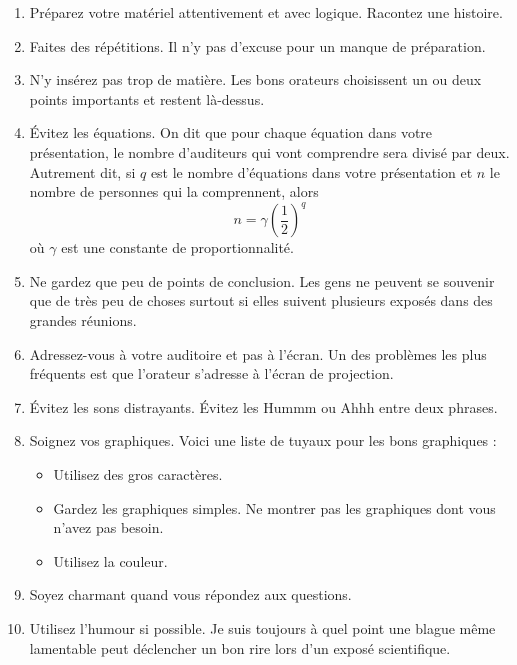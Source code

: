 \documentclass[12pt]{article}
\begin{document}
\begin{enumerate}

\item Préparez votre matériel attentivement et avec logique. Racontez une histoire.

\item Faites des répétitions. Il n'y pas d'excuse pour un manque de préparation.

\item N'y insérez pas trop de matière. Les bons orateurs choisissent un ou deux points importants et restent là-dessus.

\item Évitez les équations. On dit que pour chaque équation dans votre présentation, le nombre d'auditeurs qui vont comprendre sera divisé par deux. Autrement dit, si $q$ est le nombre d'équations dans votre présentation et $n$ le nombre de personnes qui la comprennent, alors 
\begin{equation}
n = \gamma \left( \frac{1}{2} \right)^q
\end{equation}
où $\gamma$ est une constante de proportionnalité.

\item Ne gardez que peu de points de conclusion. Les gens ne peuvent se souvenir que de très peu de choses surtout si elles suivent plusieurs exposés dans des grandes réunions.

\item Adressez-vous à votre auditoire et pas à l'écran. Un des problèmes les plus fréquents est que l'orateur s'adresse à l'écran de projection.

\item Évitez les sons distrayants. Évitez les \og Hummm\fg{} ou \og Ahhh\fg{} entre deux phrases.

\item Soignez vos graphiques. Voici une liste de tuyaux pour les bons graphiques :

\begin{itemize}
\item Utilisez des gros caractères.

\item Gardez les graphiques simples. Ne montrer pas les graphiques dont vous n'avez pas besoin.

\item Utilisez la couleur.

\end{itemize}

\item Soyez charmant quand vous répondez aux questions.

\item Utilisez l'humour si possible. Je suis toujours à quel point une blague même lamentable peut déclencher un bon rire lors d'un exposé scientifique.

\end{enumerate}
\end{document}
